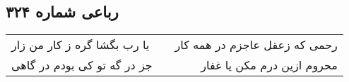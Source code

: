 \begin{center}
\section*{رباعی شماره ۳۲۴}
\label{sec:sh324}
\begin{longtable}{l p{0.5cm} r}
یا رب بگشا گره ز کار من زار
&&
رحمی که زعقل عاجزم در همه کار
\\
جز در گه تو کی بودم در گاهی
&&
محروم ازین درم مکن یا غفار
\\
\end{longtable}
\end{center}

